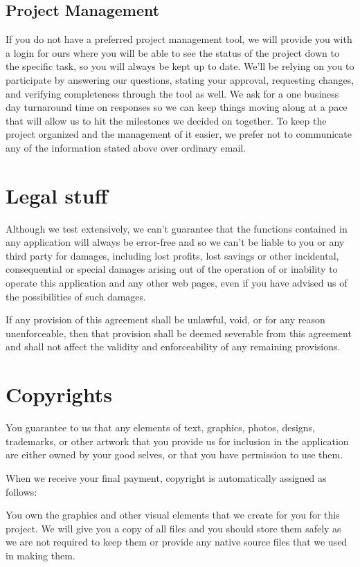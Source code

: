 \documentclass[10pt,a4paper,parskip]{scrartcl}
\begin{document}
\subsection{Project Management}

If you do not have a preferred project management tool, we will provide you
with a login for ours where you will be able to see the status of the project
down to the specific task, so you will always be kept up to date. We’ll be
relying on you to participate by answering our questions, stating your
approval, requesting changes, and verifying completeness through the tool as
well. We ask for a one business day turnaround time on responses so we can keep
things moving along at a pace that will allow us to hit the milestones we
decided on together. To keep the project organized and the management of it
easier, we prefer not to communicate any of the information stated above over
ordinary email.

\section{Legal stuff}

Although we test extensively, we can't guarantee that the functions contained
in any application will always be error-free and so we can't be liable to you
or any third party for damages, including lost profits, lost savings or other
incidental, consequential or special damages arising out of the operation of or
inability to operate this application and any other web pages, even if you have
advised us of the possibilities of such damages.

If any provision of this agreement shall be unlawful, void, or for any reason
unenforceable, then that provision shall be deemed severable from this
agreement and shall not affect the validity and enforceability of any remaining
provisions.

\section{Copyrights}

You guarantee to us that any elements of text, graphics, photos, designs,
trademarks, or other artwork that you provide us for inclusion in the
application are either owned by your good selves, or that you have permission
to use them.

When we receive your final payment, copyright is automatically assigned as
follows:

You own the graphics and other visual elements that we create for you for this
project. We will give you a copy of all files and you should store them safely
as we are not required to keep them or provide any native source files that we
used in making them.
\end{document}
